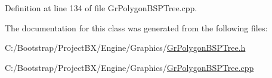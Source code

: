 Definition at line 134 of file GrPolygonBSPTree.cpp.

The documentation for this class was generated from the following files:\begin{CompactItemize}
\item 
C:/Bootstrap/ProjectBX/Engine/Graphics/\hyperlink{_gr_polygon_b_s_p_tree_8h}{GrPolygonBSPTree.h}\item 
C:/Bootstrap/ProjectBX/Engine/Graphics/\hyperlink{_gr_polygon_b_s_p_tree_8cpp}{GrPolygonBSPTree.cpp}\end{CompactItemize}
